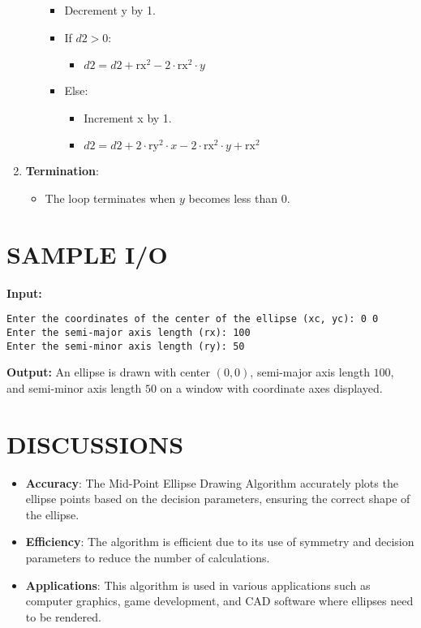 \documentclass{article}
\begin{document}
\begin{enumerate}
\begin{itemize}
\begin{itemize}
            \item Decrement y by 1.
            \item If $d2 > 0$:
            \begin{itemize}
                \item $d2 = d2 + \text{rx}^2 - 2 \cdot \text{rx}^2 \cdot y$
            \end{itemize}
            \item Else:
            \begin{itemize}
                \item Increment x by 1.
                \item $d2 = d2 + 2 \cdot \text{ry}^2 \cdot x - 2 \cdot \text{rx}^2 \cdot y + \text{rx}^2$
            \end{itemize}
        \end{itemize}
    \end{itemize}
    \item \textbf{Termination}:
    \begin{itemize}
        \item The loop terminates when $y$ becomes less than 0.
    \end{itemize}
\end{enumerate}



\section*{SAMPLE I/O}
\textbf{Input:}
\begin{verbatim}
Enter the coordinates of the center of the ellipse (xc, yc): 0 0
Enter the semi-major axis length (rx): 100
Enter the semi-minor axis length (ry): 50
\end{verbatim}

\textbf{Output:}
An ellipse is drawn with center $(0, 0)$, semi-major axis length $100$, and semi-minor axis length $50$ on a window with coordinate axes displayed.

\section*{DISCUSSIONS}
\begin{itemize}
    \item \textbf{Accuracy}: The Mid-Point Ellipse Drawing Algorithm accurately plots the ellipse points based on the decision parameters, ensuring the correct shape of the ellipse.
    \item \textbf{Efficiency}: The algorithm is efficient due to its use of symmetry and decision parameters to reduce the number of calculations.
    \item \textbf{Applications}: This algorithm is used in various applications such as computer graphics, game development, and CAD software where ellipses need to be rendered.
\end{itemize}
\end{document}
